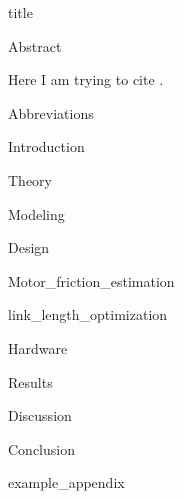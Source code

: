 \documentclass{article}
\begin{document}
{title}

\frontmatter

{Abstract}

Here I am trying to cite \cite{schulman_proximal_2017}.

\newpage
\tableofcontents

\listoffigures
\listoftables

\mainmatter

{Abbreviations}

{Introduction}
\newpage

{Theory}

{Modeling}

{Design}

{Motor_friction_estimation}

{link_length_optimization}

{Hardware}


{Results}

{Discussion}

{Conclusion}


\newpage
\printbibliography[heading = bibintoc, title = Bibliography]    %

\addappendix
{example_appendix}

\end{document}
